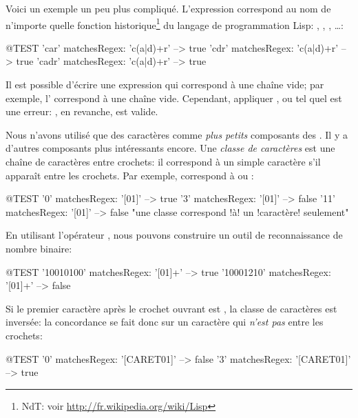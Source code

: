 \documentclass[a4paper,10pt,twoside]{book}
\begin{document}
Voici un exemple un peu plus compliqué. L'expression 
correspond au nom de n'importe quelle fonction
historique\footnote{NdT: voir \url{http://fr.wikipedia.org/wiki/Lisp}} du langage de programmation Lisp: 
 , , , \ldots:
\begin{code}{@TEST}
'car' matchesRegex: 'c(a|d)+r'   --> true
'cdr' matchesRegex: 'c(a|d)+r'   --> true
'cadr' matchesRegex: 'c(a|d)+r' --> true
\end{code} %

Il est possible d'écrire une expression qui correspond à une chaîne
vide; par exemple, l'\expreg {} correspond à une chaîne vide.
Cependant, appliquer  \ct{*}, \ct{+} ou  tel quel est une
erreur: , en revanche, est valide.

Nous n'avons utilisé que des caractères comme \emph{plus petits}
composants des \expregs.
Il y a d'autres composants plus intéressants encore. Une \emph{classe
de caractères} est une chaîne de caractères entre crochets: il
correspond à un simple caractère s'il apparaît entre les crochets. Par
exemple, \ct{[01]} correspond à  ou :
\begin{code}{@TEST}
'0' matchesRegex: '[01]'   --> true
'3' matchesRegex: '[01]'   --> false
'11' matchesRegex: '[01]' --> false  "une classe correspond !à! un !caractère! seulement"
\end{code}

En utilisant l'opérateur \ct{+}, nous pouvons construire un outil de
reconnaissance de nombre binaire:
\begin{code}{@TEST}
'10010100' matchesRegex: '[01]+' --> true
'10001210' matchesRegex: '[01]+' --> false
\end{code}

Si le premier caractère après le crochet ouvrant est ,
la classe de caractères est inversée: la concordance se fait donc sur
un caractère qui \emph{n'est pas} entre les crochets:
\begin{code}{@TEST}
'0' matchesRegex: '[CARET01]' --> false
'3' matchesRegex: '[CARET01]' --> true
\end{code}
\end{document}
